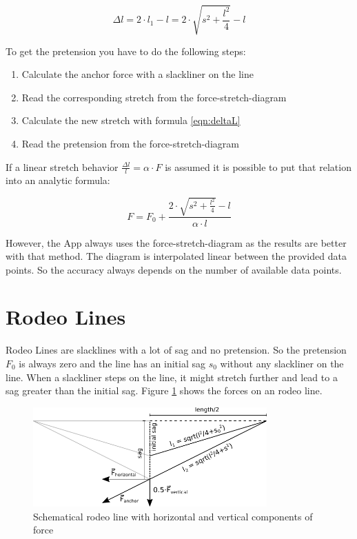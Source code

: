\begin{equation}
	\Delta l = 2\cdot l_1 - l= 2\cdot \sqrt{s^2+\frac{l^2}{4}} - l
	\label{eqn:deltaL}
\end{equation}

To get the pretension you have to do the following steps:

\begin{enumerate}
	\item Calculate the anchor force with a slackliner on the line
	\item Read the corresponding stretch from the force-stretch-diagram
	\item Calculate the new stretch with formula \ref{eqn:deltaL}
	\item Read the pretension from the force-stretch-diagram
\end{enumerate}

If a linear stretch behavior $\frac{\Delta l}{l} = \alpha\cdot F$ is assumed it is possible to put that relation into an analytic formula:

\begin{equation}
	F = F_0 + \frac{2\cdot \sqrt{s^2+\frac{l^2}{4}} - l}{\alpha\cdot l}
\end{equation}

However, the App always uses the force-stretch-diagram as the results are better with that method. The diagram is interpolated linear between the provided data points. So the accuracy always depends on the number of available data points.

\section{Rodeo Lines}

Rodeo Lines are slacklines with a lot of sag and no pretension. So the pretension $F_0$ is always zero and the line has an initial sag $s_0$ without any slackliner on the line. When a slackliner steps on the line, it might stretch further and lead to a sag greater than the initial sag. Figure \ref{fig:RodeoLineWithForces} shows the forces on an rodeo line.

\begin{figure}[htb] \centering
	\includegraphics[width=0.8\textwidth]{images/rodeoLineWithForces.pdf}
	\caption{Schematical rodeo line with horizontal and vertical components of force}
	\label{fig:RodeoLineWithForces}
\end{figure}

